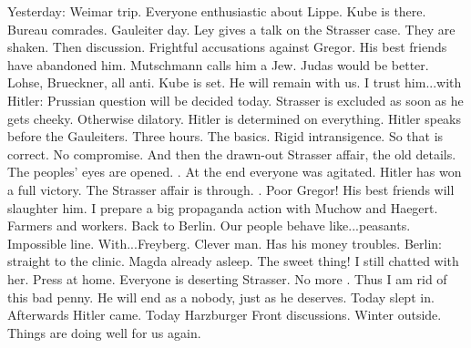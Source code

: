 Yesterday: Weimar trip. Everyone enthusiastic about Lippe. Kube is there. Bureau comrades. Gauleiter day. Ley gives a talk on the Strasser case. They are shaken. Then discussion. Frightful accusations against Gregor. His best friends have abandoned him. Mutschmann calls him a Jew. Judas would be better. Lohse, Brueckner, all anti. Kube is set. He will remain with us. I trust him...with Hitler: Prussian question will be decided today. Strasser is excluded as soon as he gets cheeky. Otherwise dilatory. Hitler is determined on everything. Hitler speaks before the Gauleiters. Three hours. The basics. Rigid intransigence. So that is correct. No compromise. And then the drawn-out Strasser affair, the old details. The peoples' eyes are opened. . At the end everyone was agitated. Hitler has won a full victory. The Strasser affair is through. . Poor Gregor! His best friends will slaughter him. I prepare a big propaganda action with Muchow and Haegert. Farmers and workers. Back to Berlin. Our people behave like...peasants. Impossible line. With...Freyberg. Clever man. Has his money troubles. Berlin: straight to the clinic. Magda already asleep. The sweet thing! I still chatted with her. Press at home. Everyone is deserting Strasser. No more . Thus I am rid of this bad penny. He will end as a nobody, just as he deserves. Today slept in. Afterwards Hitler came. Today Harzburger Front discussions. Winter outside. Things are doing well for us again.


